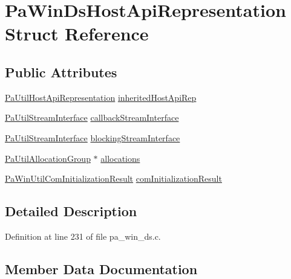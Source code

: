 \hypertarget{struct_pa_win_ds_host_api_representation}{}\section{Pa\+Win\+Ds\+Host\+Api\+Representation Struct Reference}
\label{struct_pa_win_ds_host_api_representation}
\subsection*{Public Attributes}
\begin{DoxyCompactItemize}
\item 
\hyperlink{struct_pa_util_host_api_representation}{Pa\+Util\+Host\+Api\+Representation} \hyperlink{struct_pa_win_ds_host_api_representation_afdd6db5f0c0af8ad11a2a0d4eab4dfde}{inherited\+Host\+Api\+Rep}
\item 
\hyperlink{struct_pa_util_stream_interface}{Pa\+Util\+Stream\+Interface} \hyperlink{struct_pa_win_ds_host_api_representation_aad9158766f315c2ac0c7e6a6ff01863f}{callback\+Stream\+Interface}
\item 
\hyperlink{struct_pa_util_stream_interface}{Pa\+Util\+Stream\+Interface} \hyperlink{struct_pa_win_ds_host_api_representation_aa15f24e9724e296be25e43ea955e9c0d}{blocking\+Stream\+Interface}
\item 
\hyperlink{struct_pa_util_allocation_group}{Pa\+Util\+Allocation\+Group} $\ast$ \hyperlink{struct_pa_win_ds_host_api_representation_aa68db0fc7c35453477148ab5f5cc4a19}{allocations}
\item 
\hyperlink{struct_pa_win_util_com_initialization_result}{Pa\+Win\+Util\+Com\+Initialization\+Result} \hyperlink{struct_pa_win_ds_host_api_representation_aa35ae91c55ac5a54e8eb16682f345ea4}{com\+Initialization\+Result}
\end{DoxyCompactItemize}


\subsection{Detailed Description}


Definition at line 231 of file pa\+\_\+win\+\_\+ds.\+c.



\subsection{Member Data Documentation}
